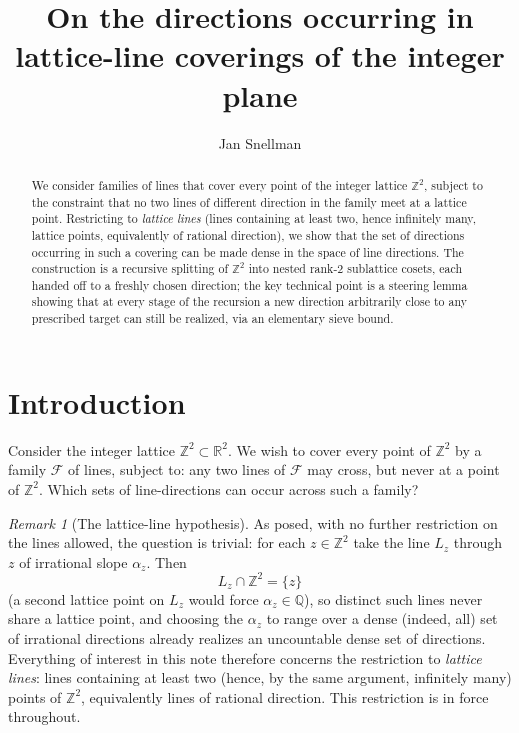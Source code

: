 \documentclass[a4paper,11pt,oneside,reqno]{amsart}
\theoremstyle{definition}
\theoremstyle{remark}
\newtheorem{remark}[definition]{Remark}
\theoremstyle{plain}
\newcommand{\Z}{\mathbb{Z}}
\newcommand{\R}{\mathbb{R}}
\begin{document}
\title[Lattice-line directions]{On the directions occurring in lattice-line coverings of the integer plane}
\author{Jan Snellman }
\address{Matematiska Institutionen, Linköpings Universitet, 581 83 Linköping, Sweden}
\maketitle

\begin{abstract}
  We consider families of lines that cover every point of the integer lattice \(\Z^2\), subject to
  the constraint that no two lines of different direction in the family meet at a lattice point.
  Restricting to \emph{lattice lines} (lines containing at least two, hence infinitely many,
  lattice points, equivalently of rational direction), we show that the set of directions
  occurring in such a covering can be made dense in the space of line directions. The construction
  is a recursive splitting of \(\Z^2\) into nested rank-2 sublattice cosets, each handed off to a
  freshly chosen direction; the key technical point is a steering lemma showing that at every
  stage of the recursion a new direction arbitrarily close to any prescribed target can still be
  realized, via an elementary sieve bound.
\end{abstract}

\section{Introduction}

Consider the integer lattice \(\Z^2\subset\R^2\). We wish to cover every point of \(\Z^2\) by a family
\(\mathcal F\) of lines, subject to: any two lines of \(\mathcal F\) may cross, but never at a point of
\(\Z^2\). Which sets of line-directions can occur across such a family?

\begin{remark}[The lattice-line hypothesis]
  \label{rem:hypothesis}
  As posed, with no further restriction on the lines allowed, the question is trivial: for each
  \(z\in\Z^2\) take the line \(L_z\) through \(z\) of irrational slope \(\alpha_z\). Then
  \begin{equation}
    \label{eq:irrational-line}
    L_z\cap\Z^2=\{z\}
  \end{equation}
  (a second lattice point on \(L_z\) would force \(\alpha_z\in\mathbb Q\)), so distinct such lines
  never share a lattice point, and choosing the \(\alpha_z\) to range over a dense (indeed, all) set of
  irrational directions already realizes an uncountable dense set of directions. Everything of
  interest in this note therefore concerns the restriction to \emph{lattice lines}: lines
  containing at least two (hence, by the same argument, infinitely many) points of \(\Z^2\),
  equivalently lines of rational direction. This restriction is in force throughout.
\end{remark}
\end{document}
